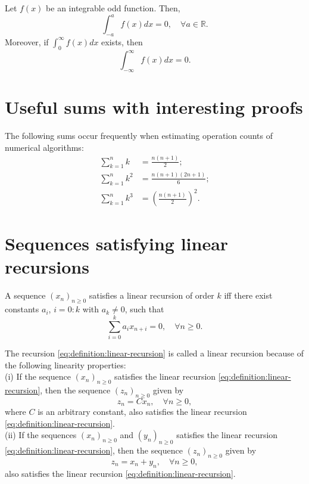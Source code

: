 \begin{lemma}
    Let $ f(x) $ be an integrable odd function. Then,
    \begin{equation}
        \int_{-a}^{a} f(x) dx = 0, \quad \forall a \in \mathbb{R}.
    \end{equation}
    Moreover, if $ \int_{0}^{\infty} f(x) dx $ exists, then
    \begin{equation}
        \int_{-\infty}^{\infty} f(x) dx = 0.
    \end{equation}
\end{lemma}

\section{Useful sums with interesting proofs}
The following sums occur frequently when estimating operation counts of numerical algorithms:
\begin{align}
    \sum_{k=1}^{n} k &= \frac{n (n + 1)}{2}; \label{eq:sum-pow1}\\
    \sum_{k=1}^{n} k^2 &= \frac{n (n + 1) (2 n + 1)}{6}; \label{eq:sum-pow2}\\
    \sum_{k=1}^{n} k^3 &= \left( \frac{n (n + 1)}{2} \right)^2. \label{eq:sum-pow3}
\end{align}

\section{Sequences satisfying linear recursions}
\begin{definition}
    A sequence $ (x_n)_{n \geq 0} $ satisfies a linear recursion of order $ k $ iff there exist constants $ a_i $, $ i = 0 : k $ with $ a_k \neq 0 $, such that
    \begin{equation}
        \sum_{i=0}^{k} a_i x_{n+i} = 0, \quad \forall n \geq 0.
        \label{eq:definition:linear-recursion}
    \end{equation}
\end{definition}

The recursion \eqref{eq:definition:linear-recursion} is called a linear recursion because of the following linearity properties:\\
(i) If the sequence $ (x_n)_{n \geq 0} $ satisfies the linear recursion \eqref{eq:definition:linear-recursion}, then the sequence $ (z_n)_{n \geq 0} $ given by
\begin{equation}
    z_n = C x_n, \quad \forall n \geq 0,
\end{equation}
where $ C $ is an arbitrary constant, also satisfies the linear recursion \eqref{eq:definition:linear-recursion}.\\
(ii) If the sequences $ (x_n)_{n \geq 0} $ and $ (y_n)_{n \geq 0} $ satisfies the linear recursion \eqref{eq:definition:linear-recursion}, then the sequence $ (z_n)_{n \geq 0} $ given by
\begin{equation}
    z_n = x_n + y_n, \quad \forall n \geq 0,
\end{equation}
also satisfies the linear recursion \eqref{eq:definition:linear-recursion}.

